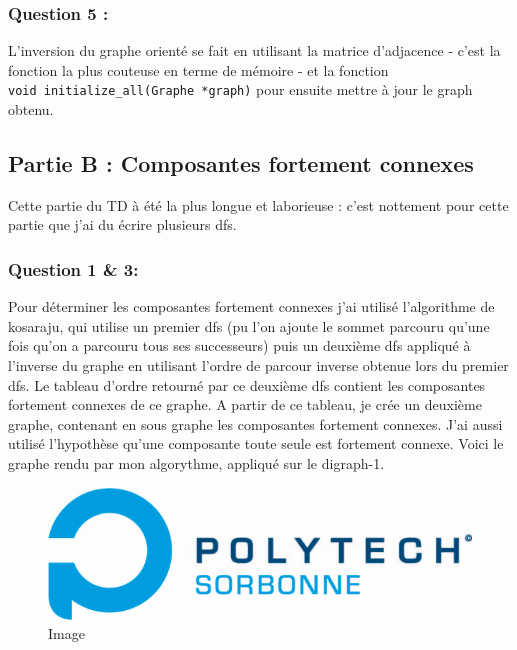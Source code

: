 \documentclass[]{article}
\begin{document}
\subsubsection{Question 5 :}\label{question-5}

L'inversion du graphe orienté se fait en utilisant la matrice
d'adjacence - c'est la fonction la plus couteuse en terme de mémoire -
et la fonction \texttt{void\ initialize\_all(Graphe\ *graph)} pour
ensuite mettre à jour le graph obtenu.

\subsection{Partie B : Composantes fortement
connexes}\label{partie-b-composantes-fortement-connexes}

Cette partie du TD à été la plus longue et laborieuse : c'est nottement
pour cette partie que j'ai du écrire plusieurs dfs.

\subsubsection{Question 1 \& 3:}\label{question-1-3}

Pour déterminer les composantes fortement connexes j'ai utilisé
l'algorithme de kosaraju, qui utilise un premier dfs (pu l'on ajoute le
sommet parcouru qu'une fois qu'on a parcouru tous ses successeurs) puis
un deuxième dfs appliqué à l'inverse du graphe en utilisant l'ordre de
parcour inverse obtenue lors du premier dfs. Le tableau d'ordre retourné
par ce deuxième dfs contient les composantes fortement connexes de ce
graphe. A partir de ce tableau, je crée un deuxième graphe, contenant en
sous graphe les composantes fortement connexes. J'ai aussi utilisé
l'hypothèse qu'une composante toute seule est fortement connexe. Voici
le graphe rendu par mon algorythme, appliqué sur le digraph-1.

\begin{figure}[htbp]
\centering
\includegraphics{./Images/polytech.jpg}
\caption{Image}
\end{figure}
\end{document}

